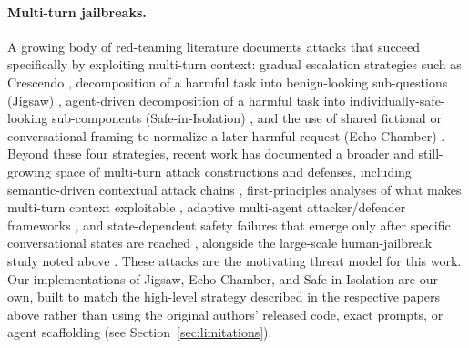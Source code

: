 \documentclass[11pt]{article}
\begin{document}
\paragraph{Multi-turn jailbreaks.} A growing body of red-teaming literature documents attacks that succeed specifically by exploiting multi-turn context: gradual escalation strategies such as Crescendo \citep{russinovich2024crescendo}, decomposition of a harmful task into benign-looking sub-questions (Jigsaw) \citep{yang2024jigsaw}, agent-driven decomposition of a harmful task into individually-safe-looking sub-components (Safe-in-Isolation) \citep{srivastav2025safeinisolation}, and the use of shared fictional or conversational framing to normalize a later harmful request (Echo Chamber) \citep{alobaid2026echochamber}. Beyond these four strategies, recent work has documented a broader and still-growing space of multi-turn attack constructions and defenses, including semantic-driven contextual attack chains \citep{yang2024chainofattack}, first-principles analyses of what makes multi-turn context exploitable \citep{sun2024multiturncontext}, adaptive multi-agent attacker/defender frameworks \citep{rahman2024xteaming}, and state-dependent safety failures that emerge only after specific conversational states are reached \citep{li2026star}, alongside the large-scale human-jailbreak study noted above \citep{li2024mhj}. These attacks are the motivating threat model for this work. Our implementations of Jigsaw, Echo Chamber, and Safe-in-Isolation are our own, built to match the high-level strategy described in the respective papers above rather than using the original authors' released code, exact prompts, or agent scaffolding (see Section~\ref{sec:limitations}).
\end{document}

